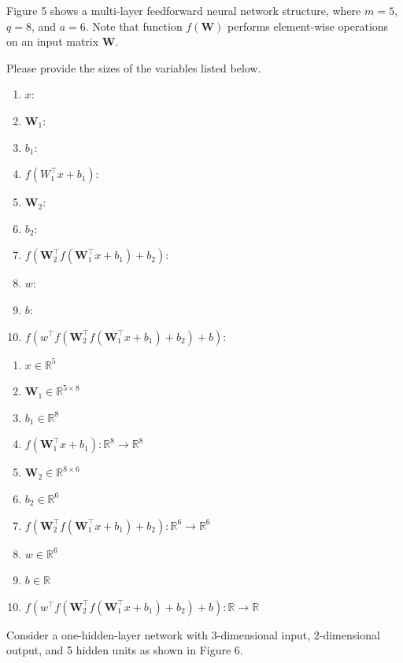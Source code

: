 \documentclass{article}
\newcommand{\R}{\mathbb{R}}
\begin{document}
\begin{probset}
\begin{prob}
    \newcommand{\W}{\mathbf{W}}
    
    Figure 5 shows a multi-layer feedforward neural network structure, where $m = 5$, $q = 8$, and $a = 6$. Note that function $f(\W)$ performs element-wise operations on an input matrix $\W$.

    \newpage

    Please provide the sizes of the variables listed below.
    \begin{enumerate}
        \item $x$:
        \item $\W_1$:
        \item $b_1$:
        \item $f(W_1^\top x + b_1)$:
        \item $\W_2$:
        \item $b_2$:
        \item $f(\W_2^\top f(\W_1^\top x + b_1) + b_2)$:
        \item $w$:
        \item $b$:
        \item $f(w^\top f(\W_2^\top f(\W_1^\top x + b_1) + b_2) + b)$:
    \end{enumerate}

    \begin{soln}
        \begin{enumerate}
            \item $x \in \R^5$
            \item $\W_1 \in \R^{5 \times 8}$
            \item $b_1 \in \R^8$
            \item $f(\W_1^\top x + b_1): \R^8 \to \R^8$
            \item $\W_2 \in \R^{8 \times 6}$
            \item $b_2 \in \R^6$
            \item $f(\W_2^\top f(\W_1^\top x + b_1) + b_2): \R^6 \to \R^6$
            \item $w \in \R^6$
            \item $b \in \R$
            \item $f(w^\top f(\W_2^\top f(\W_1^\top x + b_1) + b_2) + b): \R \to \R$
        \end{enumerate}
    \end{soln}
\end{prob}

\newpage

\begin{prob}
    Consider a one-hidden-layer network with 3-dimensional input, 2-dimensional output, and 5 hidden units as shown in Figure 6.


\end{prob}
\end{probset}
\end{document}
